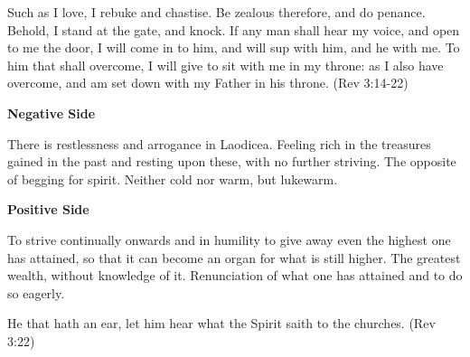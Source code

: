 Such as I love, I rebuke and chastise. Be zealous therefore, and do penance. Behold, I stand at the gate, and knock. If
any man shall hear my voice, and open to me the door, I will come in to him, and will sup with him, and he with me. To
him that shall overcome, I will give to sit with me in my throne: as I also have overcome, and am set down with my
Father in his throne. (Rev 3:14-22)

\textbf{Negative Side}

There is restlessness and arrogance in Laodicea. Feeling rich in the treasures gained in the past and resting upon
these, with no further striving. The opposite of begging for spirit. Neither cold nor warm, but lukewarm.

\textbf{Positive Side}

To strive continually onwards and in humility to give away even the highest one has attained, so that it can become an
organ for what is still higher. The greatest wealth, without knowledge of it. Renunciation of what one has attained and
to do so eagerly.

He that hath an ear, let him hear what the Spirit saith to the churches. (Rev 3:22)


